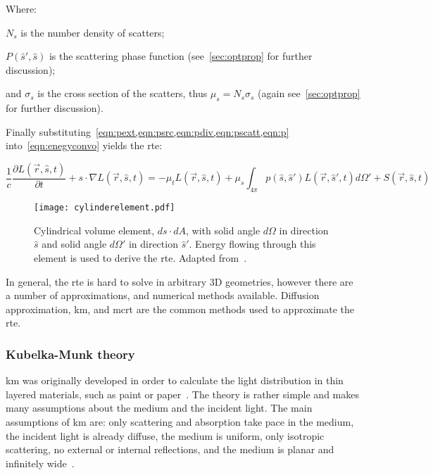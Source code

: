 \noindent Where:

\indent $N_s$ is the number density of scatters;

\indent $P(\hat{s}',\hat{s})$ is the scattering phase function (see~\cref{sec:optprop} for further discussion);

\indent and $\sigma_s$ is the cross section of the scatters, thus $\mu_s=N_s\sigma_s$ (again see~\cref{sec:optprop} for further discussion).

\medskip


Finally substituting~\cref{eqn:pext,eqn:psrc,eqn:pdiv,eqn:pscatt,eqn:p} into~\cref{eqn:enegyconvo} yields the \gls{rte}:

\begin{equation}
\frac{1}{c}\frac{\partial L(\vec{r},\hat{s},t)}{\partial t} + s\cdot \nabla L(\vec{r},\hat{s},t)=-\mu_tL(\vec{r},\hat{s},t)+\mu_s\int_{4\pi}p(\hat{s},\hat{s}')L(\vec{r},\hat{s}',t)d\Omega' + S(\vec{r},\hat{s},t)
\label{eqn:rte}
\end{equation}

\begin{figure}[!htb]
	\centering
	\texttt{[image: cylinderelement.pdf]}
	\caption{Cylindrical volume element, $ds \cdot dA$, with solid angle $d\Omega$ in direction $\hat{s}$ and solid angle $d\Omega'$ in direction $\hat{s}'$. Energy flowing through this element is used to derive the \gls{rte}. Adapted from~\cite{wang2012biomedical,chandrasekhar2013radiative}.}
	\label{fig:energydiag2}
\end{figure}

In general, the \gls{rte} is hard to solve in arbitrary 3D geometries, however there are a number of approximations, and numerical methods available. Diffusion approximation, \gls{km}, and \gls{mcrt} are the common methods used to approximate the \gls{rte}.

\subsubsection*{Kubelka-Munk theory}
\gls{km} was originally developed in order to calculate the light distribution in thin layered materials, such as paint or paper~\cite{barbaric2011kubelka}. The theory is rather simple and makes many assumptions about the medium and the incident light. The main assumptions of \gls{km} are: only scattering and absorption take pace in the medium, the incident light is already diffuse, the medium is uniform, only isotropic scattering, no external or internal reflections, and the medium is planar and infinitely wide~\cite{jasinski2011modelling,cheong1990review,gabriela2013mathematical}.

